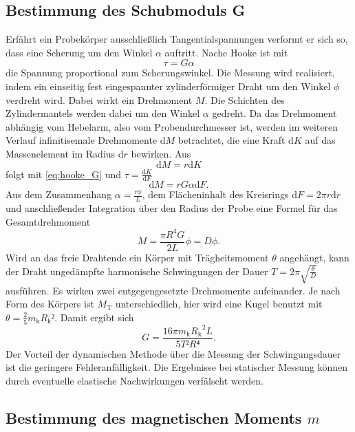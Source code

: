 \subsection{Bestimmung des Schubmoduls G}
Erfährt ein Probekörper ausschließlich Tangentialspannungen verformt er sich so, dass eine Scherung um den Winkel $\alpha$ auftritt. Nache Hooke ist mit
\begin{equation}
\tau=G\alpha
\label{eq:hooke_G}
\end{equation}
 die Spannung proportional zum Scherungswinkel. 
Die Messung wird realisiert, indem ein einseitig fest eingespannter zylinderförmiger Draht um den Winkel $\phi$ verdreht wird. Dabei wirkt ein Drehmoment $M$. Die Schichten des Zylindermantels werden dabei um den Winkel $\alpha$ gedreht. 
Da das Drehmoment abhängig vom Hebelarm, also vom Probendurchmesser ist, werden im weiteren Verlauf infinitisemale Drehmomente d$M$ betrachtet, die eine Kraft d$K$ auf das Massenelement im Radius d$r$ bewirken.
Aus
\begin{equation}
\mathup{d}M=r\mathup{d}K
\end{equation}
folgt mit \eqref{eq:hooke_G} und $\tau=\frac{\mathup{d}K}{\mathup{d}F}$
\begin{equation}
\mathup{d}M=rG\alpha\mathup{d}F.
\end{equation}
Aus dem Zusammenhang $\alpha=\frac{r\phi}{L}$, dem Flächeninhalt des Kreisrings $\mathup{d}F=2\pi r\mathup{d}r$ und anschließender Integration über den Radius der Probe eine Formel für das Gesamtdrehmoment
\begin{equation}
M=\frac{\pi R^4 G}{2L}\phi=D\phi.
\end{equation}
Wird an das freie Drahtende ein Körper mit Trägheitsmoment $\theta$ angehängt, kann der Draht ungedämpfte harmonische Schwingungen der Dauer $T=2\pi\sqrt{\frac{\theta}{D}}$ ausführen. Es wirken zwei entgegengesetzte Drehmomente aufeinander. Je nach Form des Körpers ist $M_\mathup{T}$ unterschiedlich, hier wird eine Kugel benutzt mit $\theta=\frac{2}{5}m_\mathup{k}{R_\mathup{k}}²$. Damit ergibt sich 
\begin{equation}
G=\frac{16\pi m_\mathup{k} {R_\mathup{k}}^2 L}{5T²R⁴}.
\label{eq:G}
\end{equation}
Der Vorteil der dynamischen Methode über die Messung der Schwingungsdauer ist die geringere Fehleranfälligkeit. Die Ergebnisse bei statischer Messung können durch eventuelle elastische Nachwirkungen verfälscht werden.

\subsection{Bestimmung des magnetischen Moments $m$}


